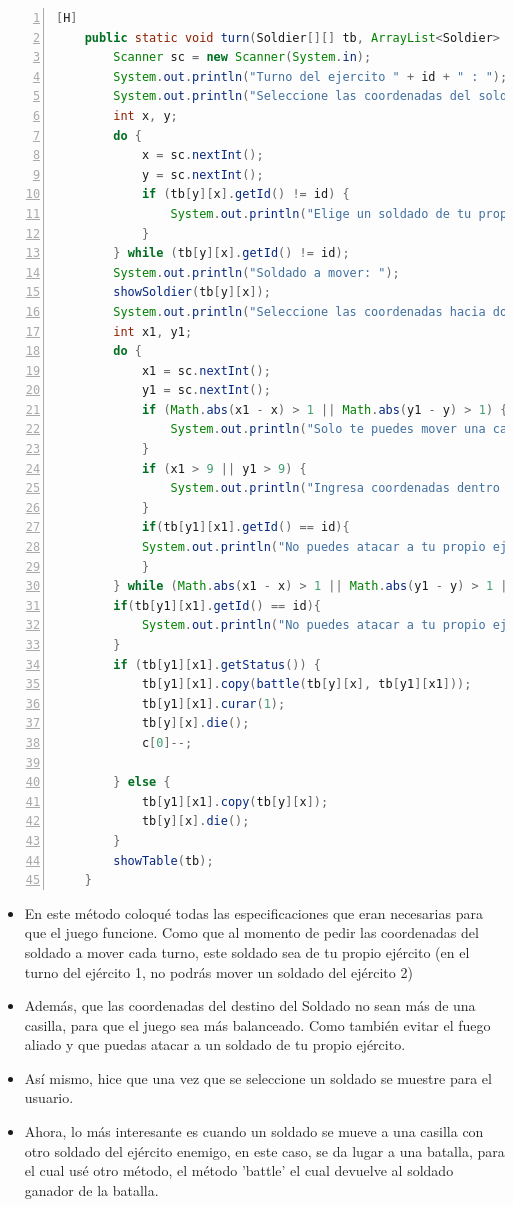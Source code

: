 \documentclass{article}
\begin{document}
	\begin{lstlisting}[language=java,caption={Método turn}, numbers=left][H]
	public static void turn(Soldier[][] tb, ArrayList<Soldier> a, int[] c, int id) {
        Scanner sc = new Scanner(System.in);
        System.out.println("Turno del ejercito " + id + " : ");
        System.out.println("Seleccione las coordenadas del soldado que movera (x, y): ");
        int x, y;
        do {
            x = sc.nextInt();
            y = sc.nextInt();
            if (tb[y][x].getId() != id) {
                System.out.println("Elige un soldado de tu propio ejercito!");
            }
        } while (tb[y][x].getId() != id);
        System.out.println("Soldado a mover: ");
        showSoldier(tb[y][x]);
        System.out.println("Seleccione las coordenadas hacia donde se movera su soldado: ");
        int x1, y1;
        do {
            x1 = sc.nextInt();
            y1 = sc.nextInt();
            if (Math.abs(x1 - x) > 1 || Math.abs(y1 - y) > 1) {
                System.out.println("Solo te puedes mover una casilla!");
            }
            if (x1 > 9 || y1 > 9) {
                System.out.println("Ingresa coordenadas dentro del tablero!");
            }
            if(tb[y1][x1].getId() == id){
            System.out.println("No puedes atacar a tu propio ejercito!");
            }
        } while (Math.abs(x1 - x) > 1 || Math.abs(y1 - y) > 1 || x1 > 9 || y1 > 9 || tb[y1][x1].getId() == id);
        if(tb[y1][x1].getId() == id){
            System.out.println("No puedes atacar a tu propio ejercito!")
        }
        if (tb[y1][x1].getStatus()) {
            tb[y1][x1].copy(battle(tb[y][x], tb[y1][x1]));
            tb[y1][x1].curar(1);
            tb[y][x].die();
            c[0]--;

        } else {
            tb[y1][x1].copy(tb[y][x]);
            tb[y][x].die();
        }
        showTable(tb);
    }
	\end{lstlisting}	
	\begin{itemize}	
		\item En este método coloqué todas las especificaciones que eran necesarias para que el juego funcione. Como que al momento de pedir las coordenadas del soldado a mover cada turno, este soldado sea de tu propio ejército (en el turno del ejército 1, no podrás mover un soldado del ejército 2)
		\item Además, que las coordenadas del destino del Soldado no sean más de una casilla, para que el juego sea más balanceado. Como también evitar el fuego aliado y que puedas atacar a un soldado de tu propio ejército.
		\item Así mismo, hice que una vez que se seleccione un soldado se muestre para el usuario.
		\item Ahora, lo más interesante es cuando un soldado se mueve a una casilla con otro soldado del ejército enemigo, en este caso, se da lugar a una batalla, para el cual usé otro método, el método 'battle' el cual devuelve al soldado ganador de la batalla.
	\end{itemize}
\end{document}
